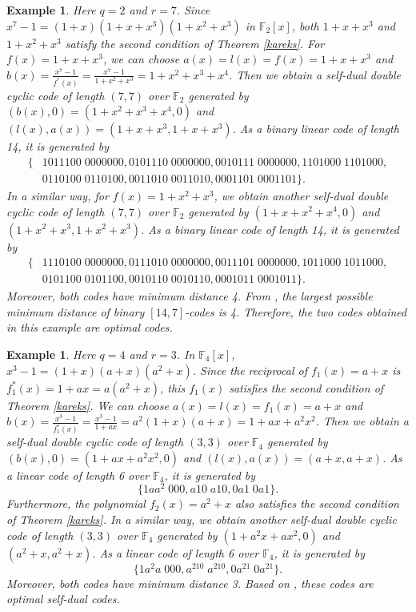 \documentclass[12pt]{article}
\newtheorem{example}[theorem]{Example}
\begin{document}
	\begin{example}\label{ex27}
		Here $q=2$ and $r=7$. Since $x^7-1=(1+x)(1+x+x^3)(1+x^2+x^3)$ in $\mathbb{F}_2[x]$, both $1+x+x^3$ and $1+x^2+x^3$ satisfy the second condition of Theorem \ref{kareks}. For $f(x)=1+x+x^3$, we can choose $a(x)=l(x)=f(x)=1+x+x^3$ and $b(x)=\frac{x^7-1}{f^{*}(x)}=\frac{x^7-1}{1+x^2+x^3}=1+x^2+x^3+x^4$. Then we obtain a self-dual double cyclic code of length $(7,7)$ over $\mathbb{F}_2$ generated by $(b(x),0)=(1+x^2+x^3+x^4,0)$ and $(l(x),a(x))=(1+x+x^3,1+x+x^3)$. As a binary linear code of length 14, it is generated by
		\begin{align*}
			\{&1011100\; 0000000,0101110\; 0000000,0010111\; 0000000,1101000\; 1101000,\\
			&0110100\; 0110100,0011010\; 0011010,0001101\; 0001101\}.
		\end{align*}
		In a similar way, for $f(x)=1+x^2+x^3$, we obtain another self-dual double cyclic code of length $(7,7)$ over $\mathbb{F}_2$ generated by $(1+x+x^2+x^4,0)$ and $(1+x^2+x^3,1+x^2+x^3)$. As a binary linear code of length 14, it is generated by
		\begin{align*}
			\{&1110100\; 0000000,0111010\; 0000000,0011101\; 0000000,1011000\; 1011000,\\
			&0101100\;0101100,0010110\;0010110,0001011\;0001011\}.
		\end{align*}
		Moreover, both codes have minimum distance 4. From \cite{Grassl}, the largest possible minimum distance of binary $[14,7]$-codes is 4. Therefore, the two codes obtained in this example are optimal codes.
	\end{example}
	
	\begin{example}\label{exampleF4}
		Here $q=4$ and $r=3$. In $\mathbb{F}_4[x]$, $x^3-1=(1+x)(a+x)(a^2+x)$. Since the reciprocal of $f_1(x)=a+x$ is $f_1^{*}(x)=1+ax=a(a^2+x)$, this $f_1(x)$ satisfies the second condition of Theorem \ref{kareks}. We can choose $a(x)=l(x)=f_1(x)=a+x$ and $b(x)=\frac{x^3-1}{f_1^{*}(x)}=\frac{x^3-1}{1+ax}=a^2(1+x)(a+x)=1+ax+a^2 x^2$. Then we obtain a self-dual double cyclic code of length $(3,3)$ over $\mathbb{F}_4$ generated by $(b(x),0)=(1+a x+a^2 x^2,0)$ and $(l(x),a(x))=(a+x,a+x)$. As a linear code of length 6 over $\mathbb{F}_4$, it is generated by
		$$\{1aa^2\; 000,a10\; a10,0a1\; 0a1\}.$$
		Furthermore, the polynomial $f_2(x)=a^2+x$ also satisfies the second condition of Theorem \ref{kareks}. In a similar way, we obtain another self-dual double cyclic code of length $(3,3)$ over $\mathbb{F}_4$ generated by $(1+a^2x+a x^2,0)$ and $(a^2+x,a^2+x)$. As a linear code of length 6 over $\mathbb{F}_4$, it is generated by
		$$\{1a^2a\; 000,a^210\; a^210,0a^21\; 0a^21\}.$$
		Moreover, both codes have minimum distance 3. Based on \cite{Harada}, these codes are optimal self-dual codes.
	\end{example}
	
\end{document}
